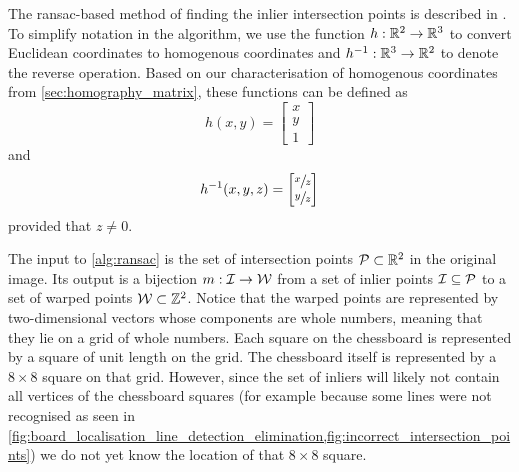 \documentclass[../main.tex]{subfiles}
\begin{document}
The \gls{ransac}-based method of finding the inlier intersection points is described in . 
To simplify notation in the algorithm, we use the function $h : \mathbb{R}^2 \to \mathbb{R}^3$ to convert Euclidean coordinates to homogenous coordinates and $h^{-1} : \mathbb{R}^3 \to \mathbb{R}^2$ to denote the reverse operation.
Based on our characterisation of homogenous coordinates from \cref{sec:homography_matrix}, these functions can be defined as
\begin{equation*}
    h(x,y) = \begin{bmatrix}
        x\\y\\1
    \end{bmatrix}
\end{equation*}
and
\begin{equation*}
    h^{-1}(x,y,z) = \begin{bmatrix}
        \sfrac{x}{z}\\
        \sfrac{y}{z}
    \end{bmatrix}
\end{equation*}
provided that $z \neq 0$.

The input to \cref{alg:ransac} is the set of intersection points ${\mathcal{P}} \subset \mathbb{R}^2$ in the original image.
Its output is a bijection $m : {\mathcal{I}} \to {\mathcal{W}}$ from a set of inlier points ${\mathcal{I}} \subseteq {\mathcal{P}}$ to a set of warped points ${\mathcal{W}} \subset \mathbb{Z}^2$. 
Notice that the warped points are represented by two-dimensional vectors whose components are whole numbers, meaning that they lie on a grid of whole numbers.
Each square on the chessboard is represented by a square of unit length on the grid.
The chessboard itself is represented by a $8 \times 8$ square on that grid.
However, since the set of inliers will likely not contain all vertices of the chessboard squares (for example because some lines were not recognised as seen in \cref{fig:board_localisation_line_detection_elimination,fig:incorrect_intersection_points}) we do not yet know the location of that $8 \times 8$ square.
\end{document}
